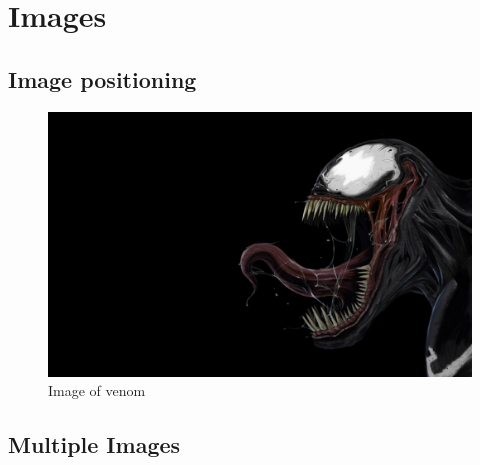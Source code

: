 \documentclass{article}
\begin{document}
\newpage
\section{Images}
\subsection{Image positioning}
\begin{figure}[h!]
    \includegraphics[width=\linewidth]{img.jpg}
    \caption{Image of venom}
    \label{fig:venom}
\end{figure}

\subsection{Multiple Images}
\end{document}
